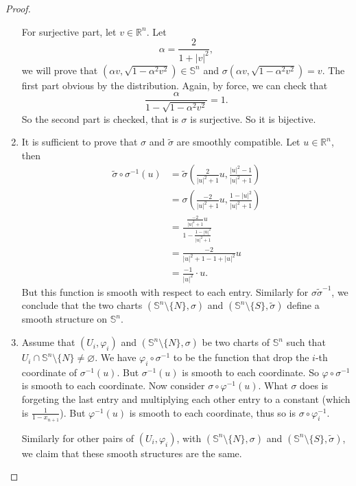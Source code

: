 \documentclass[12pt, a4paper]{article}
\theoremstyle{plain}
\newcommand{\R}{\mathbb{R}}
\newcommand{\set}[1]{\mathbb{#1}}
\def\phi{\varphi}
\def\tilde{\widetilde}
\begin{document}
\begin{proof}
\begin{enumerate}[label=(\roman*)]
            For surjective part, let $v\in \R^n$. Let $$\alpha=\frac{2}{1+|v|^2},$$
            we will prove that $(\alpha v, \sqrt{1-\alpha^2v^2})\in \set{S}^n$ and $\sigma(\alpha v, \sqrt{1-\alpha^2v^2})=v$. The first part obvious by the distribution. Again, by force, we can check that
            \[
            \frac{\alpha}{1-\sqrt{1-\alpha^2v^2}}=1.
            \]
            So the second part is checked, that is $\sigma$ is surjective. So it is bijective.

            \item It is sufficient to prove that $\sigma$ and $\tilde\sigma$ are smoothly compatible. Let $u\in \R^n$, then
            \begin{align*}
                \tilde\sigma\circ \sigma^{-1}(u)&=\tilde\sigma\left(\frac{2}{|u|^2+1}u,\frac{|u|^2-1}{|u|^2+1}\right)\\
                &=\sigma\left(\frac{-2}{|u|^2+1}u,\frac{1-|u|^2}{|u|^2+1}\right)\\
                &=\frac{\frac{-2}{|u|^2+1}u}{1-\frac{1-|u|^2}{|u|^2+1}}\\
                &=\frac{-2}{|u|^2+1-1+|u|^2}u\\
                &=\frac{-1}{|u|^2}\cdot u.
            \end{align*}
            But this function is smooth with respect to each entry. Similarly for $\sigma\tilde\sigma^{-1}$, we conclude that the two charts $(\set{S}^n\setminus\{N\},\sigma)$ and $(\set{S}^n\setminus\{S\},\tilde\sigma)$ define a smooth structure on $\set{S}^n$.
            \item Assume that $(U_i,\phi_i)$ and $(\set{S}^n\setminus\{N\},\sigma)$ be two charts of $\set{S}^n$ such that $U_i\cap \set{S}^n\setminus\{N\}\neq \varnothing$. We have
            $\phi_i\circ \sigma^{-1}$ to be the function that drop the $i$-th coordinate of $\sigma^{-1}(u)$. But $\sigma^{-1}(u)$ is smooth to each coordinate. So $\phi\circ\sigma^{-1}$ is smooth to each coordinate. Now consider $\sigma\circ \phi^{-1}(u)$. What $\sigma$ does is forgeting the last entry and multiplying each other entry to a constant (which is $\frac{1}{1-x_{n+1}}$). But $\phi^{-1}(u)$ is smooth to each coordinate, thus so is $\sigma\circ\phi_i^{-1}$. 

            Similarly for other pairs of $(U_i,\phi_i)$, with $(\set{S}^n\setminus\{N\},\sigma)$ and $(\set{S}^n\setminus\{S\},\tilde\sigma)$, we claim that these smooth structures are the same.
            
        \end{enumerate}
    \end{proof}
\end{document}
